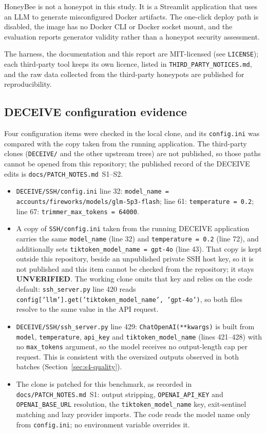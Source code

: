 \documentclass[a4paper,11pt]{article}
\begin{document}
HoneyBee is not a honeypot in this study. It is a Streamlit application that
uses an LLM to generate misconfigured Docker artifacts. The one-click deploy
path is disabled, the image has no Docker CLI or Docker socket mount, and the
evaluation reports generator validity rather than a honeypot security
assessment.

The harness, the documentation and this report are MIT-licensed (see
\texttt{LICENSE}); each third-party tool keeps its own licence, listed in
\texttt{THIRD\_PARTY\_NOTICES.md}, and the raw data collected from the
third-party honeypots are published for reproducibility.

\subsection{DECEIVE configuration evidence}

Four configuration items were checked in the local clone, and its
\texttt{config.ini} was compared with the copy taken from the running
application. The third-party clones (\texttt{DECEIVE/} and the other upstream
trees) are not published, so those paths cannot be opened from this repository;
the published record of the DECEIVE edits is
\texttt{docs/PATCH\_NOTES.md}~S1--S2.
\begin{itemize}[leftmargin=*]
\item \texttt{DECEIVE/SSH/config.ini} line 32: \texttt{model\_name =
  accounts/\allowbreak{}fireworks/\allowbreak{}models/\allowbreak{}glm-5p3-flash}; line 61: \texttt{temperature =
  0.2}; line 67: \texttt{trimmer\_max\_tokens = 64000}.
\item A copy of \texttt{SSH/config.ini} taken from the running DECEIVE
  application carries the same \texttt{model\_name} (line 32) and
  \texttt{temperature = 0.2} (line 72), and additionally sets
  \texttt{tiktoken\_model\_name = gpt-4o} (line 43). That copy is kept outside
  this repository, beside an unpublished private SSH host key, so it is not
  published and this item cannot be checked from the repository; it stays
  \textbf{UNVERIFIED}. The working clone omits that key and relies on the code
  default: \texttt{ssh\_server.py} line 420 reads
  \texttt{config['llm'].get('tiktoken\_model\_name', 'gpt-4o')}, so both files
  resolve to the same value in the API request.
\item \texttt{DECEIVE/SSH/ssh\_server.py} line 429: \texttt{ChatOpenAI(**kwargs)}
  is built from \texttt{model}, \texttt{temperature}, \texttt{api\_key} and
  \texttt{tiktoken\_model\_name} (lines 421--428) with no \texttt{max\_tokens}
  argument, so the model receives no output-length cap per request. This is
  consistent with the oversized outputs observed in both batches
  (Section~\ref{sec:s4-quality}).
\item The clone is patched for this benchmark, as recorded in
  \texttt{docs/PATCH\_NOTES.md}~S1: output stripping, \texttt{OPENAI\_API\_KEY}
  and \texttt{OPENAI\_BASE\_URL} resolution, the \texttt{tiktoken\_model\_name}
  key, exit-sentinel matching and lazy provider imports. The code reads the
  model name only from \texttt{config.ini}; no environment variable overrides
  it.
\end{itemize}
\end{document}
